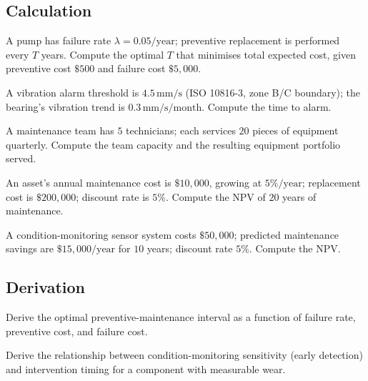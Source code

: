 \subsection*{Calculation}

\begin{exercise}
A pump has failure rate $\lambda = 0.05/\text{year}$; preventive replacement is performed every $T$ years. Compute the optimal $T$ that minimises total expected cost, given preventive cost $\$500$ and failure cost $\$5{,}000$.
\end{exercise}

\begin{exercise}
A vibration alarm threshold is $4.5\,\text{mm/s}$ (ISO 10816-3, zone B/C boundary); the bearing's vibration trend is $0.3\,\text{mm/s/month}$. Compute the time to alarm.
\end{exercise}

\begin{exercise}
A maintenance team has $5$ technicians; each services $20$ pieces of equipment quarterly. Compute the team capacity and the resulting equipment portfolio served.
\end{exercise}

\begin{exercise}
An asset's annual maintenance cost is $\$10{,}000$, growing at $5\%/\text{year}$; replacement cost is $\$200{,}000$; discount rate is $5\%$. Compute the NPV of $20$ years of maintenance.
\end{exercise}

\begin{exercise}
A condition-monitoring sensor system costs $\$50{,}000$; predicted maintenance savings are $\$15{,}000/\text{year}$ for $10$ years; discount rate $5\%$. Compute the NPV.
\end{exercise}

\subsection*{Derivation}

\begin{exercise}
Derive the optimal preventive-maintenance interval as a function of failure rate, preventive cost, and failure cost.
\end{exercise}

\begin{exercise}
Derive the relationship between condition-monitoring sensitivity (early detection) and intervention timing for a component with measurable wear.
\end{exercise}


